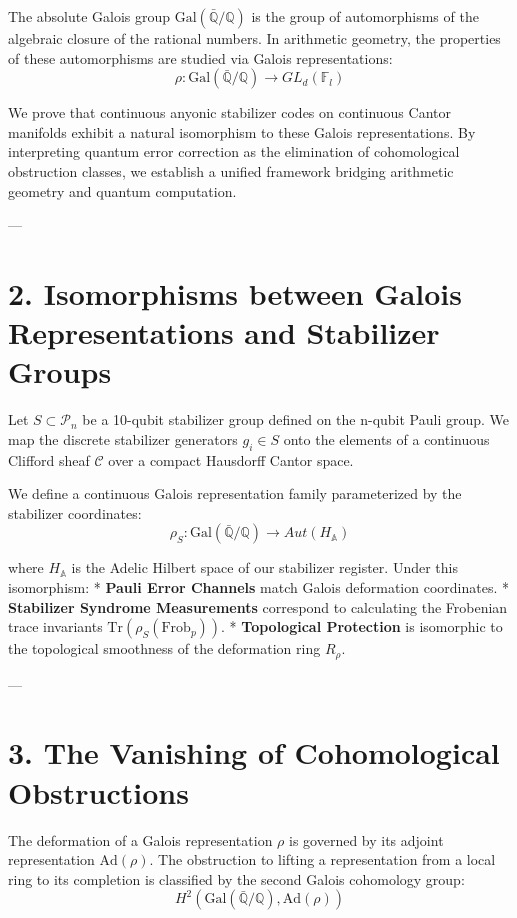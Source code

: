 \documentclass[11pt,twocolumn]{article}
\begin{document}
The absolute Galois group $\text{Gal}(\bar{\mathbb{Q}}/\mathbb{Q})$ is the group of automorphisms of the algebraic closure of the rational numbers. In arithmetic geometry, the properties of these automorphisms are studied via Galois representations:
$$\rho: \text{Gal}(\bar{\mathbb{Q}}/\mathbb{Q}) \to GL_d(\mathbb{F}_l)$$

We prove that continuous anyonic stabilizer codes on continuous Cantor manifolds exhibit a natural isomorphism to these Galois representations. By interpreting quantum error correction as the elimination of cohomological obstruction classes, we establish a unified framework bridging arithmetic geometry and quantum computation.

---

\section{2. Isomorphisms between Galois Representations and Stabilizer Groups}
Let $S \subset \mathcal{P}_n$ be a 10-qubit stabilizer group defined on the n-qubit Pauli group. We map the discrete stabilizer generators $g_i \in S$ onto the elements of a continuous Clifford sheaf $\mathcal{C}$ over a compact Hausdorff Cantor space. 

We define a continuous Galois representation family parameterized by the stabilizer coordinates:
$$\rho_S: \text{Gal}(\bar{\mathbb{Q}}/\mathbb{Q}) \to Aut(H_{\mathbb{A}})$$

where $H_{\mathbb{A}}$ is the Adelic Hilbert space of our stabilizer register. Under this isomorphism:
*   \textbf{Pauli Error Channels} match Galois deformation coordinates.
*   \textbf{Stabilizer Syndrome Measurements} correspond to calculating the Frobenian trace invariants $\text{Tr}(\rho_S(\text{Frob}_p))$.
*   \textbf{Topological Protection} is isomorphic to the topological smoothness of the deformation ring $R_{\rho}$.

---

\section{3. The Vanishing of Cohomological Obstructions}
The deformation of a Galois representation $\rho$ is governed by its adjoint representation $\text{Ad}(\rho)$. The obstruction to lifting a representation from a local ring to its completion is classified by the second Galois cohomology group:
$$H^2(\text{Gal}(\bar{\mathbb{Q}}/\mathbb{Q}), \text{Ad}(\rho))$$
\end{document}
